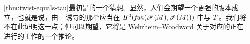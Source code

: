 \noqed
\begin{remark}\label{thm:kontsevich-conjecture-remark}
\cref{thm:twist-equals-tau}最初是\trKontsevich{}的一个猜想。显然，人们会期望一个更强的版本成立，也就是说，由 $\tau$ 诱导的那个\trAutomorphism{}应当在 $H^0(\mathit{fun}(\mathscr{F}(M),\mathscr{F}(M)))$ 中与 $T$ \trCanonical{}\trIsomorphic。我们将不在此证明这一点；但可以期望，它将是 Wehrheim--Woodward 关于\trLagrange{}对应的正在进行的工作的一个推论。
\end{remark}
